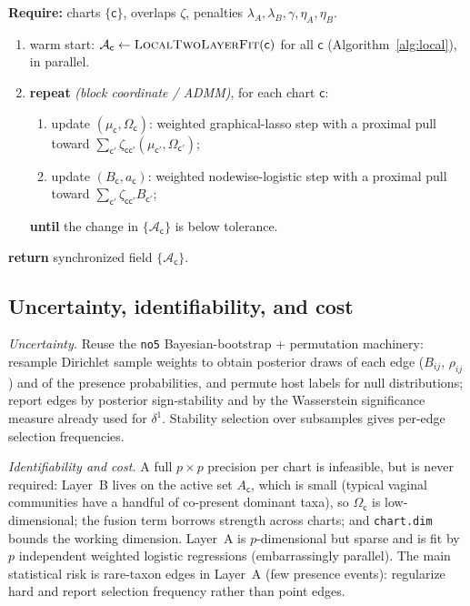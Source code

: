 \documentclass[11pt]{article}
\theoremstyle{definition}
\theoremstyle{plain}
\theoremstyle{remark}
\newcommand{\1}{\mathbf{1}}
\newcommand{\Prec}{\Omega}
\newcommand{\Edge}{B}
\newcommand{\Field}{\mathcal{A}}
\newcommand{\cc}{\mathsf{c}}              %
\begin{document}
\begin{algorithm}[t]
\caption{\textsc{SynchronizedField} --- fused estimation over the atlas}
\label{alg:sync}
\textbf{Require:} charts $\{\cc\}$, overlaps $\zeta$, penalties
  $\lambda_A,\lambda_B,\gamma,\eta_A,\eta_B$.
\begin{enumerate}[label=\arabic*:,leftmargin=2.4em,topsep=2pt,itemsep=1pt]
\item warm start: $\Field_\cc\gets\textsc{LocalTwoLayerFit}(\cc)$ for all $\cc$
  (Algorithm~\ref{alg:local}), in parallel.
\item \textbf{repeat} \textit{(block coordinate / ADMM)}, for each chart $\cc$:
  \begin{enumerate}[label=(\alph*),leftmargin=1.9em,topsep=1pt,itemsep=1pt]
  \item update $(\mu_\cc,\Prec_\cc)$: weighted graphical-lasso step with a
    proximal pull toward $\sum_{\cc'}\zeta_{\cc\cc'}(\mu_{\cc'},\Prec_{\cc'})$;
  \item update $(\Edge_\cc,a_\cc)$: weighted nodewise-logistic step with a
    proximal pull toward $\sum_{\cc'}\zeta_{\cc\cc'}\Edge_{\cc'}$;
  \end{enumerate}
  \textbf{until} the change in $\{\Field_\cc\}$ is below tolerance.
\end{enumerate}
\textbf{return} synchronized field $\{\Field_\cc\}$.
\end{algorithm}

\subsection{Uncertainty, identifiability, and cost}\label{sec:uq}
\emph{Uncertainty.} Reuse the \texttt{no5} Bayesian-bootstrap + permutation
machinery: resample Dirichlet sample weights to obtain posterior draws of each
edge ($\Edge_{ij}$, $\rho_{ij}$) and of the presence probabilities, and permute
host labels for null distributions; report edges by posterior sign-stability and
by the Wasserstein significance measure already used for $\delta^1$. Stability
selection \cite{stabsel} over subsamples gives per-edge selection frequencies.

\emph{Identifiability and cost.} A full $p\times p$ precision per chart is
infeasible, but is never required: Layer~B lives on the active set $A_\cc$, which
is small (typical vaginal communities have a handful of co-present dominant taxa),
so $\Prec_\cc$ is low-dimensional; the fusion term borrows strength across charts;
and \texttt{chart.dim} bounds the working dimension. Layer~A is $p$-dimensional
but sparse and is fit by $p$ independent weighted logistic regressions
(embarrassingly parallel). The main statistical risk is rare-taxon edges in
Layer~A (few presence events): regularize hard and report selection frequency
rather than point edges.
\end{document}
